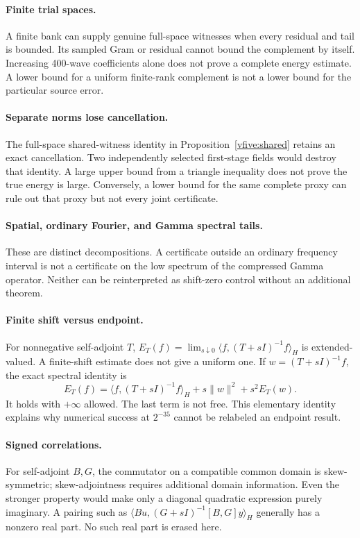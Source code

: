 \documentclass[11pt,a4paper]{article}
\numberwithin{equation}{section}
\theoremstyle{definition}\newtheorem{definition}[theorem]{Definition}
\theoremstyle{remark}\newtheorem{remark}[theorem]{Remark}
\newcommand{\rhip}[2]{\langle#1,#2\rangle_H}
\begin{document}
\paragraph{Finite trial spaces.} A finite bank can supply genuine full-space witnesses when every residual and tail is bounded. Its sampled Gram or residual cannot bound the complement by itself. Increasing 400-wave coefficients alone does not prove a complete energy estimate. A lower bound for a uniform finite-rank complement is not a lower bound for the particular source error.

\paragraph{Separate norms lose cancellation.} The full-space shared-witness identity in Proposition~\ref{vfive:shared} retains an exact cancellation. Two independently selected first-stage fields would destroy that identity. A large upper bound from a triangle inequality does not prove the true energy is large. Conversely, a lower bound for the same complete proxy can rule out that proxy but not every joint certificate.

\paragraph{Spatial, ordinary Fourier, and Gamma spectral tails.} These are distinct decompositions. A certificate outside an ordinary frequency interval is not a certificate on the low spectrum of the compressed Gamma operator. Neither can be reinterpreted as shift-zero control without an additional theorem.

\paragraph{Finite shift versus endpoint.} For nonnegative self-adjoint $T$, $E_T(f)=\lim_{s\downarrow0}\rhip f{(T+sI)^{-1}f}$ is extended-valued. A finite-shift estimate does not give a uniform one. If $w=(T+sI)^{-1}f$, the exact spectral identity is
\[
 E_T(f)=\rhip f{(T+sI)^{-1}f}+s\|w\|^2+s^2E_T(w).
\]
It holds with $+\infty$ allowed. The last term is not free. This elementary identity explains why numerical success at $2^{-35}$ cannot be relabeled an endpoint result.

\paragraph{Signed correlations.} For self-adjoint $B,G$, the commutator on a compatible common domain is skew-symmetric; skew-adjointness requires additional domain information. Even the stronger property would make only a diagonal quadratic expression purely imaginary. A pairing such as $\rhip{Bu}{(G+sI)^{-1}[B,G]y}$ generally has a nonzero real part. No such real part is erased here.
\end{document}
